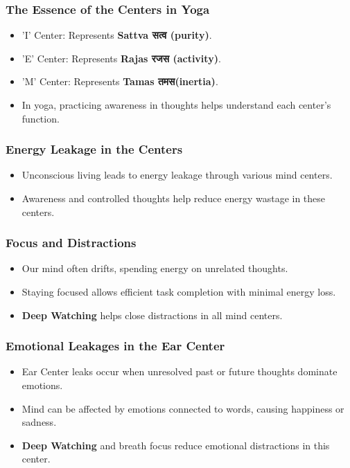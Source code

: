 \begin{frame}[fragile]\frametitle{The Essence of the Centers in Yoga}
    \begin{itemize}    
        \item 'I' Center: Represents \textbf{Sattva सत्व (purity)}.
        \item 'E' Center: Represents \textbf{Rajas रजस (activity)}.
        \item 'M' Center: Represents \textbf{Tamas तमस(inertia)}.
        \item In yoga, practicing awareness in thoughts helps understand each center’s function.
    \end{itemize}
\end{frame}

\begin{frame}[fragile]\frametitle{Energy Leakage in the Centers}
    \begin{itemize}
        \item Unconscious living leads to energy leakage through various mind centers.
        \item Awareness and controlled thoughts help reduce energy wastage in these centers.
    \end{itemize}
\end{frame}

\begin{frame}[fragile]\frametitle{Focus and Distractions}
    \begin{itemize}
        \item Our mind often drifts, spending energy on unrelated thoughts.
        \item Staying focused allows efficient task completion with minimal energy loss.
        \item \textbf{Deep Watching} helps close distractions in all mind centers.
    \end{itemize}
\end{frame}

\begin{frame}[fragile]\frametitle{Emotional Leakages in the Ear Center}
    \begin{itemize}
        \item Ear Center leaks occur when unresolved past or future thoughts dominate emotions.
        \item Mind can be affected by emotions connected to words, causing happiness or sadness.
        \item \textbf{Deep Watching} and breath focus reduce emotional distractions in this center.
    \end{itemize}
\end{frame}

